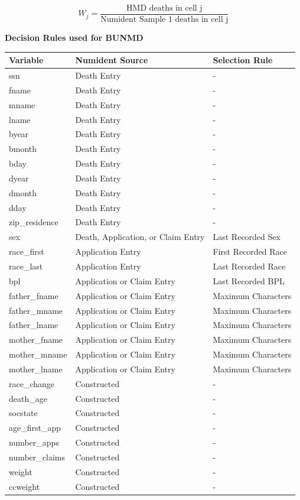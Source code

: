 \documentclass[
  11pt,
]{article}
\begin{document}
\begin{equation}
  W_j = \frac{\text{HMD deaths in cell j}}{\text{Numident Sample 1 deaths in cell j}} 
\end{equation}

\newpage

\textbf{\large Decision Rules used for BUNMD}

\begin{longtable}[]{@{}lll@{}}
\toprule
Variable & Numident Source & Selection Rule \\
\midrule
\endhead
ssn & Death Entry & - \\
fname & Death Entry & - \\
mname & Death Entry & - \\
lname & Death Entry & - \\
byear & Death Entry & - \\
bmonth & Death Entry & - \\
bday & Death Entry & - \\
dyear & Death Entry & - \\
dmonth & Death Entry & - \\
dday & Death Entry & - \\
zip\_residence & Death Entry & - \\
sex & Death, Application, or Claim Entry & Last Recorded Sex \\
race\_first & Application Entry & First Recorded Race \\
race\_last & Application Entry & Last Recorded Race \\
bpl & Application or Claim Entry & Last Recorded BPL \\
father\_fname & Application or Claim Entry & Maximum Characters \\
father\_mname & Application or Claim Entry & Maximum Characters \\
father\_lname & Application or Claim Entry & Maximum Characters \\
mother\_fname & Application or Claim Entry & Maximum Characters \\
mother\_mname & Application or Claim Entry & Maximum Characters \\
mother\_lname & Application or Claim Entry & Maximum Characters \\
race\_change & Constructed & - \\
death\_age & Constructed & - \\
socstate & Constructed & - \\
age\_first\_app & Constructed & - \\
number\_apps & Constructed & - \\
number\_claims & Constructed & - \\
weight & Constructed & - \\
ccweight & Constructed & - \\
\bottomrule
\end{longtable}
\end{document}
